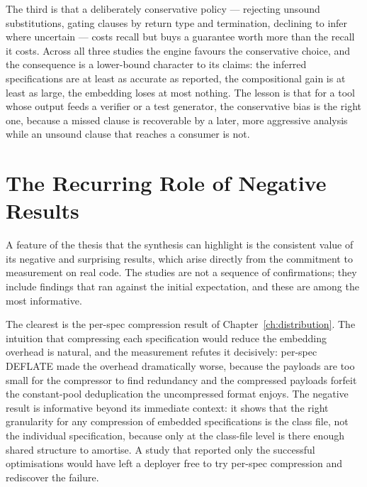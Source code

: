 The third is that a deliberately conservative policy --- rejecting unsound
substitutions, gating clauses by return type and termination, declining to infer
where uncertain --- costs recall but buys a guarantee worth more than the recall it
costs. Across all three studies the engine favours the conservative choice, and the
consequence is a lower-bound character to its claims: the inferred specifications
are at least as accurate as reported, the compositional gain is at least as large,
the embedding loses at most nothing. The lesson is that for a tool whose output
feeds a verifier or a test generator, the conservative bias is the right one,
because a missed clause is recoverable by a later, more aggressive analysis while
an unsound clause that reaches a consumer is not.

\section{The Recurring Role of Negative Results}
\label{sec:syn-negative}

A feature of the thesis that the synthesis can highlight is the consistent value
of its negative and surprising results, which arise directly from the commitment
to measurement on real code. The studies are not a sequence of confirmations;
they include findings that ran against the initial expectation, and these are
among the most informative.

The clearest is the per-spec compression result of
Chapter~\ref{ch:distribution}. The intuition that compressing each
specification would reduce the embedding overhead is natural, and the measurement
refutes it decisively: per-spec DEFLATE made the overhead dramatically worse,
because the payloads are too small for the compressor to find redundancy and the
compressed payloads forfeit the constant-pool deduplication the uncompressed
format enjoys. The negative result is informative beyond its immediate context:
it shows that the right granularity for any compression of embedded
specifications is the class file, not the individual specification, because only
at the class-file level is there enough shared structure to amortise. A study that
reported only the successful optimisations would have left a deployer free to try
per-spec compression and rediscover the failure.

